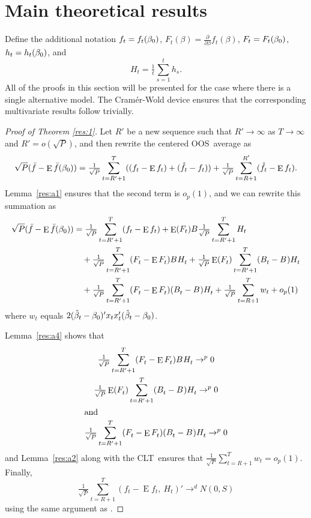 \documentclass[12pt,fleqn]{article}
\theoremstyle{definition}
\DeclareMathOperator{\E}{E}
\newcommand{\btrue}[1][]{\if#1*\hat\beta_{T+1}\else\beta_0\fi}
\newcommand{\bh}{\hat{\beta}}
\newcommand{\fb}{\bar{f}}
\newcommand{\fh}{\hat{f}}
\newcommand{\osum}[1]{\sum_{#1=R+1}^T}
\newcommand{\osumb}[1]{\sum_{#1=R'+1}^T}
\newcommand{\oclt}[1]{\tfrac{1}{\sqrt{P}} \osum{#1}}
\newcommand{\ocltb}[1]{\tfrac{1}{\sqrt{P}} \osumb{#1}}
\newcommand{\clt}{CLT}
\newcommand{\oos}{OOS}
\begin{document}
\appendix
\section{Main theoretical results}
\label{sec:B}

\newcommand{\WesA}[1][]{\ocltb{t}
  (F_t^{#1} - \E^{#1} F_t^{#1}) B^{#1} H_t^{#1}}
\newcommand{\WesB}[1][]{\tfrac{1}{\sqrt{P}} \E^{#1}(F_t^{#1}) \osumb{t} (B_t^{#1} -
  B^{#1}) H_t^{#1}}
\newcommand{\WesC}[1][]{\ocltb{t}
  (F_t^{#1} - \E^{#1} F_t^{#1}) (B_t^{#1} - B^{#1}) H_t^{#1}}

Define the additional notation 
$f_t = f_t(\btrue)$,
$F_t(\beta) = \tfrac{\partial}{\partial \beta} f_t(\beta)$,
$F_t = F_t(\btrue)$,
$h_t = h_t(\btrue)$,
and
\begin{equation*}
  H_{t} = \tfrac1t \sum_{s=1}^t h_{s}.
\end{equation*}
All of the proofs in this section will be presented for the case where
there is a single alternative model. The Cram\'er-Wold device ensures
that the corresponding multivariate results follow trivially.

\begin{proof}[Proof of Theorem \ref{res:1}]
  Let $R'$ be a new sequence such that $R' \to \infty$ as $T \to \infty$
  and $R' = o(\sqrt{P})$, and then rewrite the centered \oos\ average as
  \begin{equation*}
    \sqrt{P} (\fb - \E \fb(\btrue))
    = \ocltb{t} ((f_t - \E f_t) + (\fh_t - f_t))
      + \tfrac{1}{\sqrt{P}} \sum_{t=R+1}^{R'} (\fh_t - \E f_t).
  \end{equation*}
  Lemma~\ref{res:a1} ensures that the second term is $o_p(1)$, and
  we can rewrite this summation as
  \begin{align*}
    \sqrt{P} (\fb - \E \fb(\btrue))
    &= \ocltb{t} (f_t - \E f_t) + \E(F_t) B \ocltb{t} H_t \\
    & \quad + \WesA + \WesB \\ & \quad + \WesC + \oclt{t} w_t + o_p(1)
  \end{align*}
  where $w_t$ equals $2 (\bh_t - \btrue)' x_t x_t' (\bh_t - \btrue)$.

  Lemma~\ref{res:a4} shows that
  \begin{gather}
    \WesA \to^{p} 0 \label{eq:11} \\
    \WesB \to^{p} 0 \label{eq:12} \\
    \intertext{and}
    \WesC \to^{p} 0 \label{eq:13}
  \end{gather}
  and Lemma~\ref{res:a2} along with the \clt\ ensures that $\oclt{t}
  w_t = o_{p}(1)$. Finally,
  \begin{equation*}
    \oclt{t} (f_t - \E f_t,\ H_t)' \to^d N(0, S)
  \end{equation*}
  using the same argument as \citet{Wes:96}.
\end{proof}
\end{document}
